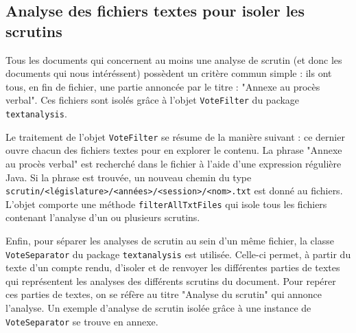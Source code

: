 \subsection{Analyse des fichiers textes pour isoler les scrutins}

Tous les documents qui concernent au moins une analyse de scrutin (et donc les documents qui nous intéréssent) possèdent un critère commun simple : ils ont tous, en fin de fichier, une partie annoncée par le titre : "Annexe au procès verbal". Ces fichiers sont isolés grâce à l'objet \verb|VoteFilter| du package \verb|textanalysis|.

Le traitement de l'objet \verb|VoteFilter| se résume de la manière suivant : ce dernier ouvre chacun des fichiers textes pour en explorer le contenu. La phrase "Annexe au procès verbal" est recherché dans le fichier à l'aide d'une expression régulière Java. Si la phrase est trouvée, un nouveau chemin du type \verb|scrutin/<législature>/<années>/<session>/<nom>.txt| est donné au fichiers. L'objet comporte une méthode \verb|filterAllTxtFiles| qui isole tous les fichiers contenant l'analyse d'un ou plusieurs scrutins.

Enfin, pour séparer les analyses de scrutin au sein d'un même fichier, la classe \verb|VoteSeparator| du package \verb|textanalysis| est utilisée. Celle-ci permet, à partir du texte d'un compte rendu, d'isoler et de renvoyer les différentes parties de textes qui représentent les analyses des différents scrutins du document. Pour repérer ces parties de textes, on se réfère au titre "Analyse du scrutin" qui annonce l'analyse.\newline
Un exemple d'analyse de scrutin isolée grâce à une instance de \verb|VoteSeparator| se trouve en annexe.
